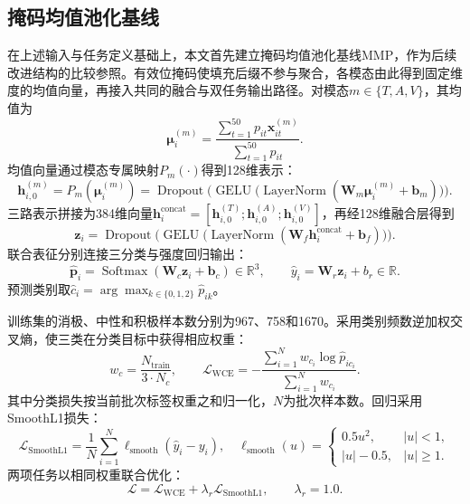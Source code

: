 \subsection{掩码均值池化基线}\label{subsec:q2_base}
\QTwoParagraph 在上述输入与任务定义基础上，本文首先建立掩码均值池化基线MMP，作为后续改进结构的比较参照。有效位掩码使填充后缀不参与聚合，各模态由此得到固定维度的均值向量，再接入共同的融合与双任务输出路径。对模态$m\in\{T,A,V\}$，其均值为
\begin{equation}
\boldsymbol\mu_i^{(m)} = \frac{\sum_{t=1}^{50} p_{it} \mathbf x_{it}^{(m)}}{\sum_{t=1}^{50} p_{it}}.
\label{eq:q2_mean_pool}
\end{equation}
均值向量通过模态专属映射$P_m(\cdot)$得到128维表示：
\begin{equation}
\mathbf h_{i,0}^{(m)} = P_m\left(\boldsymbol\mu_i^{(m)}\right) = \operatorname{Dropout}\Big(\operatorname{GELU}\big(\operatorname{LayerNorm}(\mathbf W_m \boldsymbol\mu_i^{(m)} + \mathbf b_m)\big)\Big).
\label{eq:q2_proj_layer}
\end{equation}
三路表示拼接为384维向量$\mathbf h_i^{\mathrm{concat}}=[\mathbf h_{i,0}^{(T)};\mathbf h_{i,0}^{(A)};\mathbf h_{i,0}^{(V)}]$，再经128维融合层得到
\begin{equation}
\mathbf z_i = \operatorname{Dropout}\Big(\operatorname{GELU}\big(\operatorname{LayerNorm}(\mathbf W_f \mathbf h_i^{\mathrm{concat}} + \mathbf b_f)\big)\Big).
\end{equation}
联合表征分别连接三分类与强度回归输出：
\begin{equation}
\hat{\mathbf p}_i = \operatorname{Softmax}(\mathbf W_c \mathbf z_i + \mathbf b_c) \in \mathbb R^3,\qquad
\hat y_i = \mathbf W_r \mathbf z_i + b_r \in \mathbb R.
\label{eq:q2_heads}
\end{equation}
预测类别取$\hat c_i=\arg\max_{k\in\{0,1,2\}}\hat p_{ik}$。

\QTwoParagraph 训练集的消极、中性和积极样本数分别为967、758和1670。采用类别频数逆加权交叉熵，使三类在分类目标中获得相应权重：
\begin{equation}
w_c = \frac{N_{\mathrm{train}}}{3 \cdot N_c},\qquad
\mathcal L_{\mathrm{WCE}} = -\frac{\sum_{i=1}^N w_{c_i}\log\hat p_{i c_i}}{\sum_{i=1}^N w_{c_i}}.
\end{equation}
其中分类损失按当前批次标签权重之和归一化，$N$为批次样本数。回归采用SmoothL1损失：
\begin{equation}
\mathcal L_{\mathrm{SmoothL1}} = \frac{1}{N}\sum_{i=1}^N \ell_{\mathrm{smooth}}(\hat y_i - y_i),\quad
\ell_{\mathrm{smooth}}(u) = \begin{cases}
0.5 u^2, & |u| < 1,\\
|u| - 0.5, & |u| \ge 1.
\end{cases}
\end{equation}
两项任务以相同权重联合优化：
\begin{equation}
\mathcal L = \mathcal L_{\mathrm{WCE}} + \lambda_r \mathcal L_{\mathrm{SmoothL1}},\qquad \lambda_r = 1.0.
\label{eq:q2_loss_full}
\end{equation}


